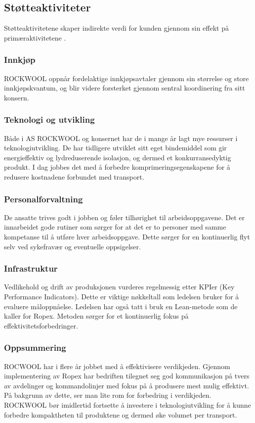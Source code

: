 \subsection{Støtteaktiviteter}
Støtteaktivitetene skaper indirekte verdi for kunden gjennom sin effekt på primæraktivitetene \cite[s.~132]{FjeldstadogLunnan2018}. 

\subsubsection*{Innkjøp}
ROCKWOOL oppnår fordelaktige innkjøpsavtaler gjennom sin størrelse og store innkjøpskvantum, og blir videre forsterket gjennom sentral koordinering fra sitt konsern.

\subsubsection*{Teknologi og utvikling}
Både i AS ROCKWOOL og konsernet har de i mange år lagt mye ressurser i teknologiutvikling. De har tidligere utviklet sitt eget bindemiddel som gir energieffektiv og lydreduserende isolasjon, og dermed et konkurransedyktig produkt. I dag jobbes det med å forbedre komprimeringsegenskapene for å redusere kostnadene forbundet med transport.

\subsubsection*{Personalforvaltning}
De ansatte trives godt i jobben og føler tilhørighet til arbeidsoppgavene. Det er innarbeidet gode rutiner som sørger for at det er to personer med samme kompetanse til å utføre hver arbeidsoppgave. Dette sørger for en kontinuerlig flyt selv ved sykefravær og eventuelle oppsigelser.

\subsubsection*{Infrastruktur}
Vedlikehold og drift av produksjonen vurderes regelmessig etter KPIer (Key Performance Indicators). Dette er viktige nøkkeltall som ledelsen bruker for å evaluere måloppnåelse. Ledelsen har også tatt i bruk en Lean-metode som de kaller for Ropex. Metoden sørger for et kontinuerlig fokus på effektivitetsforbedringer.

\subsubsection*{Oppsummering}
ROCWOOL har i flere år jobbet med å effektivisere verdikjeden. Gjennom implementering av Ropex har bedriften tilegnet seg god kommunikasjon på tvers av avdelinger og kommandolinjer med fokus på å produsere mest mulig effektivt. På bakgrunn av dette, ser man lite rom for forbedring i verdikjeden. ROCKWOOL bør imidlertid fortsette å investere i teknologiutvikling for å kunne forbedre kompaktheten til produktene og dermed øke volumet per transport.

